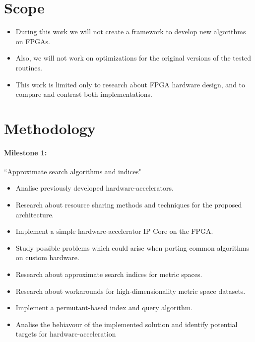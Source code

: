 \documentclass[11pt,letterpaper]{article}
\begin{document}
\section{Scope}
\begin{itemize}
\item During this work we will not create a framework to develop new algorithms on FPGAs. 
\item Also, we will not work on optimizations for the original versions of the tested routines.
\item This work is limited only to research about FPGA hardware design, and to compare and contrast both implementations.
\end{itemize}



\section{Methodology}


\paragraph{Milestone 1:} ``Approximate search algorithms and indices"
\begin{itemize}
\item Analise previously developed hardware-accelerators.
\item Research about resource sharing methods and techniques for the proposed architecture.
\item Implement a simple hardware-accelerator IP Core on the FPGA.
\item Study possible problems which could arise when porting common algorithms on custom hardware.
\item Research about approximate search indices for metric spaces.
\item Research about workarounds for high-dimensionality metric space datasets.
\item Implement a permutant-based index and query algorithm.
\item Analise the behiavour of the implemented solution and identify potential targets for hardware-acceleration
\end{itemize}
\end{document}
